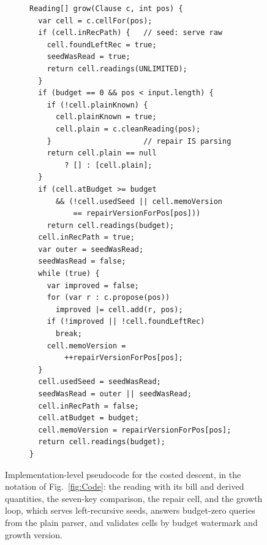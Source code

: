 \documentclass[manuscript]{acmart}
\begin{document}
\begin{figure}
\begin{subfigure}[t]{.46\linewidth}
\begin{lstlisting}[firstnumber=49]
Reading[] grow(Clause c, int pos) {
  var cell = c.cellFor(pos);
  if (cell.inRecPath) {   // seed: serve raw
    cell.foundLeftRec = true;
    seedWasRead = true;
    return cell.readings(UNLIMITED);
  }
  if (budget == 0 && pos < input.length) {
    if (!cell.plainKnown) {
      cell.plainKnown = true;
      cell.plain = c.cleanReading(pos);
    }                     // repair IS parsing
    return cell.plain == null
        ? [] : [cell.plain];
  }
  if (cell.atBudget >= budget
      && (!cell.usedSeed || cell.memoVersion
          == repairVersionForPos[pos]))
    return cell.readings(budget);
  cell.inRecPath = true;
  var outer = seedWasRead;
  seedWasRead = false;
  while (true) {
    var improved = false;
    for (var r : c.propose(pos))
      improved |= cell.add(r, pos);
    if (!improved || !cell.foundLeftRec)
      break;
    cell.memoVersion =
        ++repairVersionForPos[pos];
  }
  cell.usedSeed = seedWasRead;
  seedWasRead = outer || seedWasRead;
  cell.inRecPath = false;
  cell.atBudget = budget;
  cell.memoVersion = repairVersionForPos[pos];
  return cell.readings(budget);
}
\end{lstlisting}
\end{subfigure}
\caption{Implementation-level pseudocode for the costed descent, in the notation of Fig.~\ref{fig:Code}: the reading with its bill and derived quantities, the seven-key comparison, the repair cell, and the growth loop, which serves left-recursive seeds, answers budget-zero queries from the plain parser, and validates cells by budget watermark and growth version.}
\label{fig:RecoveryCode}
\end{figure}
\end{document}
